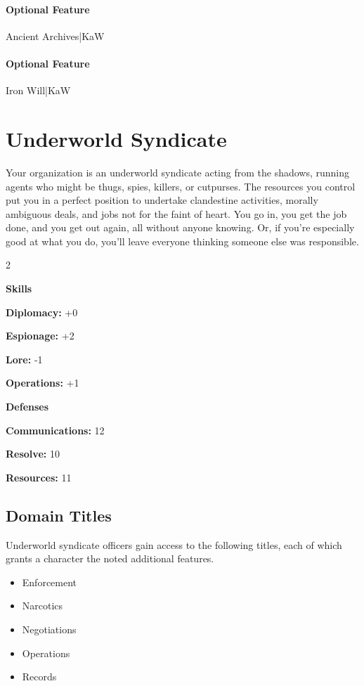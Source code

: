 \documentclass[10pt,a4paper,twoside,bg=print,twocolumn,openany,nodeprecatedcode]{dndbook}
\begin{document}
\paragraph{Optional Feature}
Ancient Archives|KaW

\paragraph{Optional Feature}
Iron Will|KaW

\section{Underworld Syndicate}
Your organization is an underworld syndicate acting from the shadows, running agents who might be thugs, spies, killers, or cutpurses. The resources you control put you in a perfect position to undertake clandestine activities, morally ambiguous deals, and jobs not for the faint of heart. You go in, you get the job done, and you get out again, all without anyone knowing. Or, if you're especially good at what you do, you'll leave everyone thinking someone else was responsible.


\begin{itemize}
\begin{multicols}{2}
\item \textbf{Skills}
\item \textbf{Diplomacy:} +0
\item \textbf{Espionage:} +2
\item \textbf{Lore:} -1
\item \textbf{Operations:} +1
\item \textbf{Defenses}
\item \textbf{Communications:} 12
\item \textbf{Resolve:} 10
\item \textbf{Resources:} 11
\end{multicols}

\end{itemize}

\subsection{Domain Titles}
Underworld syndicate officers gain access to the following titles, each of which grants a character the noted additional features.


\begin{itemize}
\item Enforcement
\item Narcotics
\item Negotiations
\item Operations
\item Records
\end{itemize}
\end{document}

